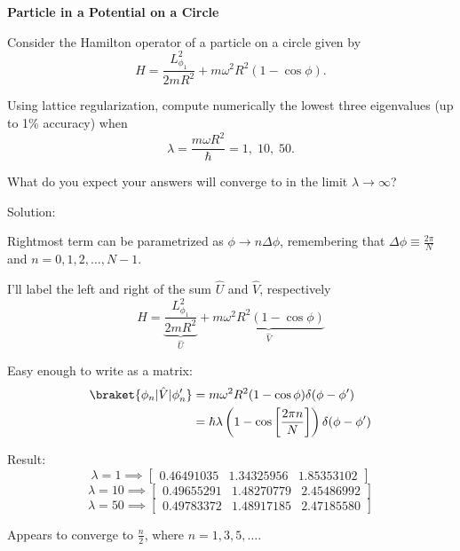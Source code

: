     \newpage
    \begin{homeworkProblem}
        \textbf{Particle in a Potential on a Circle}

        Consider the Hamilton operator of a particle on a circle given by
        \[
            H = \frac{L_{\phi_1}^2}{2mR^2} + m\omega^2R^2(1-\cos\phi).
        \]

        Using lattice regularization, compute numerically the lowest three eigenvalues (up to 1\% accuracy) when
        \[
            \lambda = \frac{m\omega R^2}{\hbar} = 1,\;10,\;50.
        \]

        What do you expect your answers will converge to in the limit $\lambda \to \infty$?
        \begin{callout}{Solution:}

            Rightmost term can be parametrized as $\phi \to n \Delta \phi$, remembering that $\Delta \phi \equiv \frac{2\pi}{N}$ and $n=0,1,2,\dots,N-1$.

            I'll label the left and right of the sum $\hat{U}$ and $\hat{V}$, respectively
            $$H = \underbrace{\frac{L_{\phi_1}^2}{2mR^2}}_{\hat{U}} + \underbrace{m\omega^2R^2(1-\cos\phi)}_{\hat{V}}$$

            Easy enough to write as a matrix:
            \begin{align*}
                \braket{\phi_n | \hat{V} | \phi_n'} &= m \omega^{2} R^{2}(1-\cos\phi) \delta(\phi-\phi') \\ 
                                                    &= \hbar \lambda \left( 1 - \cos \left[ \frac{2\pi n}{N} \right] \right) \delta(\phi-\phi')
            \end{align*}

            Result:
            $$ \lambda = 1 \implies \begin{bmatrix} 0.46491035 & 1.34325956 & 1.85353102 \end{bmatrix} $$
            $$ \lambda = 10 \implies \begin{bmatrix} 0.49655291 & 1.48270779 & 2.45486992 \end{bmatrix} $$
            $$ \lambda = 50 \implies \begin{bmatrix} 0.49783372 & 1.48917185 & 2.47185580 \end{bmatrix} $$

            Appears to converge to $\frac{n}{2}$, where $n=1, 3, 5, \dots$.

            \vspace{1em}

        \end{callout}
    \end{homeworkProblem}


